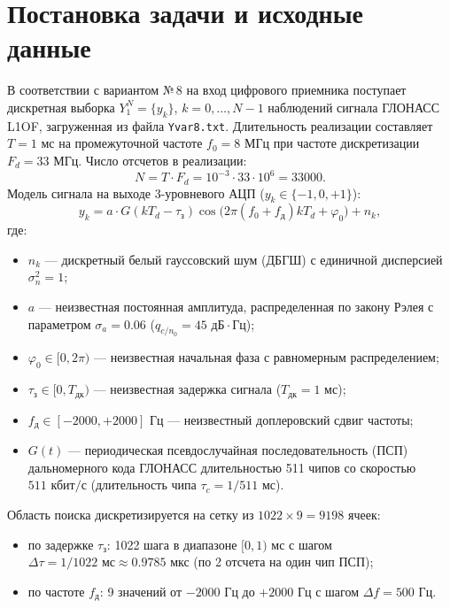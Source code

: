 \section{Постановка задачи и исходные данные}
В соответствии с вариантом №\,8 на вход цифрового приемника поступает дискретная выборка $Y_1^N = \{y_k\}$, $k = 0, \dots, N-1$ наблюдений сигнала ГЛОНАСС L1OF, загруженная из файла \texttt{Yvar8.txt}. Длительность реализации составляет $T = 1\text{ мс}$ на промежуточной частоте $f_0 = 8\text{ МГц}$ при частоте дискретизации $F_d = 33\text{ МГц}$. Число отсчетов в реализации:
\begin{equation}
N = T \cdot F_d = 10^{-3} \cdot 33 \cdot 10^6 = 33000.
\end{equation}
Модель сигнала на выходе 3-уровневого АЦП ($y_k \in \{-1, 0, +1\}$):
\begin{equation}
y_k = a \cdot G(k T_d - \tau_{\text{з}}) \cos\bigl(2\pi(f_0 + f_{\text{д}}) k T_d + \varphi_0\bigr) + n_k,
\end{equation}
где:
\begin{itemize}
    \item $n_k$ --- дискретный белый гауссовский шум (ДБГШ) с единичной дисперсией $\sigma_n^2 = 1$;
    \item $a$ --- неизвестная постоянная амплитуда, распределенная по закону Рэлея с параметром $\sigma_a = 0.06$ ($q_{c/n_0} = 45\text{ дБ}\cdot\text{Гц}$);
    \item $\varphi_0 \in [0, 2\pi)$ --- неизвестная начальная фаза с равномерным распределением;
    \item $\tau_{\text{з}} \in [0, T_{\text{дк}})$ --- неизвестная задержка сигнала ($T_{\text{дк}} = 1\text{ мс}$);
    \item $f_{\text{д}} \in [-2000, +2000]\text{ Гц}$ --- неизвестный доплеровский сдвиг частоты;
    \item $G(t)$ --- периодическая псевдослучайная последовательность (ПСП) дальномерного кода ГЛОНАСС длительностью 511 чипов со скоростью $511\text{ кбит/с}$ (длительность чипа $\tau_c = 1/511\text{ мс}$).
\end{itemize}

Область поиска дискретизируется на сетку из $1022 \times 9 = 9198$ ячеек:
\begin{itemize}
    \item по задержке $\tau_{\text{з}}$: 1022 шага в диапазоне $[0, 1)\text{ мс}$ с шагом $\Delta \tau = 1/1022\text{ мс} \approx 0.9785\text{ мкс}$ (по 2 отсчета на один чип ПСП);
    \item по частоте $f_{\text{д}}$: 9 значений от $-2000\text{ Гц}$ до $+2000\text{ Гц}$ с шагом $\Delta f = 500\text{ Гц}$.
\end{itemize}
